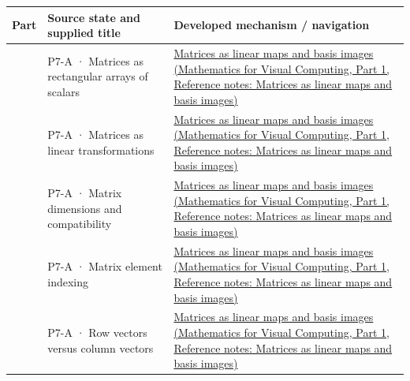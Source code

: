 {\def\LTcaptype{none} %
\begin{longtable}[]{@{}
  >{\raggedright\arraybackslash}p{}
  >{\raggedright\arraybackslash}p{}
  >{\raggedright\arraybackslash}p{}@{}}
\toprule\noalign{}
\begin{minipage}[b]{\linewidth}\raggedright
Part
\end{minipage} & \begin{minipage}[b]{\linewidth}\raggedright
Source state and supplied title
\end{minipage} & \begin{minipage}[b]{\linewidth}\raggedright
Developed mechanism / navigation
\end{minipage} \\
\midrule\noalign{}
\endhead
\bottomrule\noalign{}
\endlastfoot
601 & P7-A · Matrices as rectangular arrays of scalars & \href{../02-Mathematics-for-Visual-Computing-P01/main.pdf\#nameddest=appendix-bd39c3bf5d64}{Matrices as linear maps and basis images (Mathematics for Visual Computing, Part 1, Reference notes: Matrices as linear maps and basis images)} \\
602 & P7-A · Matrices as linear transformations & \href{../02-Mathematics-for-Visual-Computing-P01/main.pdf\#nameddest=appendix-bd39c3bf5d64}{Matrices as linear maps and basis images (Mathematics for Visual Computing, Part 1, Reference notes: Matrices as linear maps and basis images)} \\
603 & P7-A · Matrix dimensions and compatibility & \href{../02-Mathematics-for-Visual-Computing-P01/main.pdf\#nameddest=appendix-bd39c3bf5d64}{Matrices as linear maps and basis images (Mathematics for Visual Computing, Part 1, Reference notes: Matrices as linear maps and basis images)} \\
604 & P7-A · Matrix element indexing & \href{../02-Mathematics-for-Visual-Computing-P01/main.pdf\#nameddest=appendix-bd39c3bf5d64}{Matrices as linear maps and basis images (Mathematics for Visual Computing, Part 1, Reference notes: Matrices as linear maps and basis images)} \\
605 & P7-A · Row vectors versus column vectors & \href{../02-Mathematics-for-Visual-Computing-P01/main.pdf\#nameddest=appendix-bd39c3bf5d64}{Matrices as linear maps and basis images (Mathematics for Visual Computing, Part 1, Reference notes: Matrices as linear maps and basis images)} \\

\end{longtable}}
